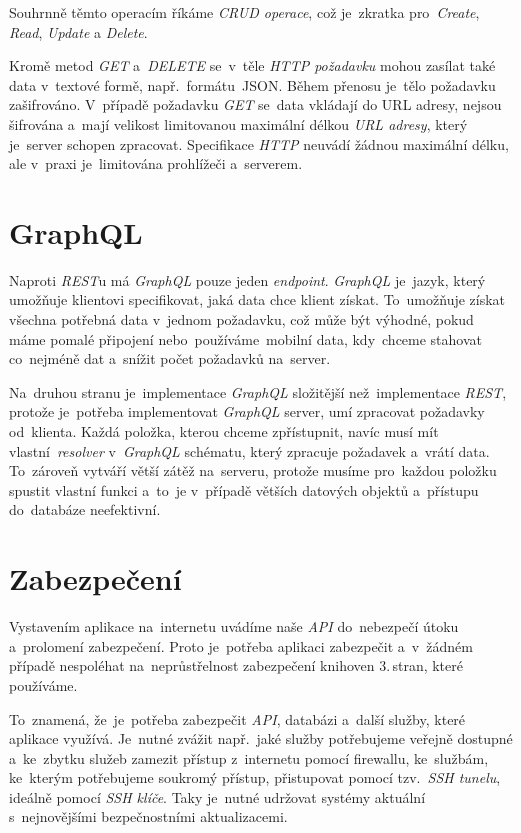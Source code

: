 \documentclass[11pt,a4paper]{report}
\begin{document}
            Souhrnně těmto operacím říkáme \emph{CRUD operace}, což je~zkratka pro~\emph{Create}, \emph{Read}, \emph{Update} a \emph{Delete}.

            Kromě metod \emph{GET} a~\emph{DELETE} se~v~těle \emph{HTTP požadavku} mohou zasílat také data v~textové formě, např.~formátu~JSON. Během přenosu je~tělo požadavku zašifrováno. V~případě požadavku \emph{GET} se~data vkládají do URL adresy, nejsou šifrována a~mají velikost limitovanou maximální délkou \emph{URL adresy}, který je~server schopen zpracovat. Specifikace \emph{HTTP} neuvádí žádnou maximální délku, ale v~praxi je~limitována prohlížeči a~serverem. \cite[3.2.1]{ietf-httpbis-messaging-03}

        \section{GraphQL}
            Naproti \emph{REST}u má \emph{GraphQL} pouze jeden \emph{endpoint}. \emph{GraphQL} je~jazyk, který umožňuje klientovi specifikovat, jaká data chce klient získat. To~umožňuje získat všechna potřebná data v~jednom požadavku, což může být výhodné, pokud máme pomalé připojení nebo~používáme~mobilní data, kdy~chceme stahovat co~nejméně dat a~snížit počet požadavků na~server.

            Na~druhou stranu je~implementace \emph{GraphQL} složitější než~implementace \emph{REST}, protože je~potřeba implementovat \emph{GraphQL} server, umí zpracovat požadavky od~klienta. Každá položka, kterou chceme zpřístupnit, navíc musí mít vlastní~\emph{resolver} v~\emph{GraphQL} schématu, který zpracuje požadavek a~vrátí data. To~zároveň vytváří větší zátěž na~serveru, protože musíme pro~každou položku spustit vlastní funkci a~to~je v~případě větších datových objektů a~přístupu do~databáze neefektivní.

        \section{Zabezpečení}
            Vystavením aplikace na~internetu uvádíme naše \emph{API} do~nebezpečí útoku a~prolomení zabezpečení. Proto je~potřeba aplikaci zabezpečit a~v~žádném případě nespoléhat na~neprůstřelnost zabezpečení knihoven 3.\,stran, které používáme.
            
            To~znamená, že~je~potřeba zabezpečit \emph{API}, databázi a~další služby, které aplikace využívá. Je~nutné zvážit např.~jaké služby potřebujeme veřejně dostupné a~ke~zbytku služeb zamezit přístup z~internetu pomocí firewallu, ke~službám, ke~kterým potřebujeme soukromý přístup, přistupovat pomocí tzv.~\emph{SSH tunelu}, ideálně pomocí \emph{SSH klíče}. Taky je~nutné udržovat systémy aktuální s~nejnovějšími bezpečnostními aktualizacemi.
            
\end{document}
